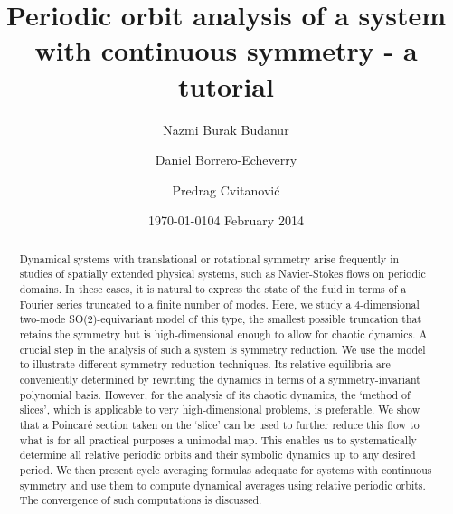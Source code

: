 \documentclass[aip,cha,
reprint,
secnumarabic,
nofootinbib, tightenlines,
nobibnotes, showkeys, showpacs,
superscriptaddress,
]{revtex4-1}
\begin{document}
\title[Periodic orbit analysis of a system with continuous symmetry]
{Periodic orbit analysis of a system with continuous symmetry - a tutorial}

\author{Nazmi Burak Budanur}
\author{Daniel Borrero-Echeverry}
\author{Predrag Cvitanovi\'{c}}
    \ifdraft
\date{\today}
    \else
\date{04 February 2014}
   \fi

\begin{abstract}
Dynamical systems with translational or rotational symmetry arise
frequently in studies of spatially extended physical systems, such as
Navier-Stokes flows on periodic domains. In these cases, it is natural to
express the state of the fluid in terms of a Fourier series truncated to a
finite number of modes. Here, we study a 4-dimensional two-mode
SO(2)-equivariant model of this type, the smallest possible truncation
that retains the symmetry but is high-dimensional enough to
allow for chaotic dynamics. A crucial step in the analysis of such a system
is symmetry reduction. We use the model to illustrate different
symmetry-reduction techniques. Its relative equilibria are conveniently
determined by rewriting the dynamics in terms of a symmetry-invariant
polynomial basis. However, for the analysis of its chaotic dynamics, the `method of
slices', which is applicable to very high-dimensional problems, is
preferable. We show that a Poincar\'e section taken on the `slice' can be
used to further reduce this flow to what is for all practical purposes a
unimodal map. This enables us to systematically determine all relative
periodic orbits and their symbolic dynamics up to any desired period. We
then present cycle averaging formulas adequate for systems with continuous symmetry 
and use them to compute dynamical averages using relative periodic orbits. The convergence
of such computations is discussed.
\end{abstract}

\maketitle
\end{document}
